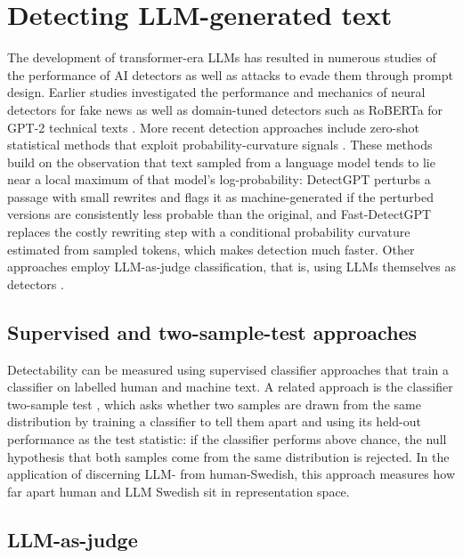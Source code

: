 \documentclass[thesis]{cluu}
\begin{document}
\section{Detecting LLM-generated text}
The development of transformer-era LLMs has resulted in numerous studies of the performance of AI detectors as well as attacks to evade them through prompt design. Earlier studies investigated the performance and mechanics of neural detectors for fake news \parencite{zellers2020defendingneuralfakenews, pagnoni-etal-2022-threat} as well as domain-tuned detectors such as RoBERTa for GPT-2 technical texts \parencite{rodriguez-etal-2022-cross}. More recent detection approaches include zero-shot statistical methods that exploit probability-curvature signals \parencite{mitchell2023detectgpt, bao2024fastdetectgpt}. These methods build on the observation that text sampled from a language model tends to lie near a local maximum of that model's log-probability: DetectGPT \parencite{mitchell2023detectgpt} perturbs a passage with small rewrites and flags it as machine-generated if the perturbed versions are consistently less probable than the original, and Fast-DetectGPT \parencite{bao2024fastdetectgpt} replaces the costly rewriting step with a conditional probability curvature estimated from sampled tokens, which makes detection much faster. Other approaches employ LLM-as-judge classification, that is, using LLMs themselves as detectors \parencite{zhu-etal-2023-beat, zheng2023judging}.

\subsection{Supervised and two-sample-test approaches}
Detectability can be measured using supervised classifier approaches that train a classifier on labelled human and machine text. A related approach is the classifier two-sample test \parencite{lopezpaz2017revisiting}, which asks whether two samples are drawn from the same distribution by training a classifier to tell them apart and using its held-out performance as the test statistic: if the classifier performs above chance, the null hypothesis that both samples come from the same distribution is rejected. In the application of discerning LLM- from human-Swedish, this approach measures how far apart human and LLM Swedish sit in representation space.

\subsection{LLM-as-judge}
\end{document}
